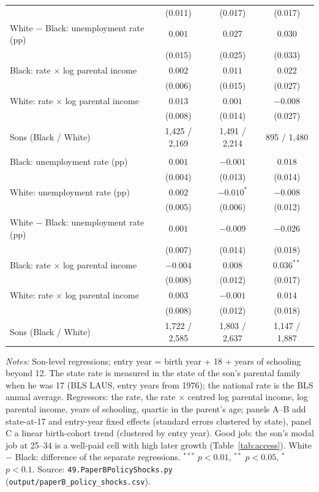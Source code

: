 \begin{table}[!htbp]
{{\begin{tabular}{lccc}
 & (0.011) & (0.017) & (0.017) \\
White $-$ Black: unemployment rate (pp) & $0.001$ & $0.027$ & $0.030$ \\
 & (0.015) & (0.025) & (0.033) \\
Black: rate $\times$ log parental income & $0.002$ & $0.011$ & $0.022$ \\
 & (0.006) & (0.015) & (0.027) \\
White: rate $\times$ log parental income & $0.013$ & $0.001$ & $-0.008$ \\
 & (0.008) & (0.014) & (0.027) \\
Sons (Black / White) & 1,425 / 2,169 & 1,491 / 2,214 & 895 / 1,480 \\
\addlinespace
\multicolumn{4}{l}{\textit{C. National unemployment rate at entry (linear cohort trend)}} \\
Black: unemployment rate (pp) & $0.001$ & $-0.001$ & $0.018$ \\
 & (0.004) & (0.013) & (0.014) \\
White: unemployment rate (pp) & $0.002$ & $-0.010^{*}$ & $-0.008$ \\
 & (0.005) & (0.006) & (0.012) \\
White $-$ Black: unemployment rate (pp) & $0.001$ & $-0.009$ & $-0.026$ \\
 & (0.007) & (0.014) & (0.018) \\
Black: rate $\times$ log parental income & $-0.004$ & $0.008$ & $0.036^{**}$ \\
 & (0.008) & (0.012) & (0.017) \\
White: rate $\times$ log parental income & $0.003$ & $-0.001$ & $0.014$ \\
 & (0.008) & (0.012) & (0.018) \\
Sons (Black / White) & 1,722 / 2,585 & 1,803 / 2,637 & 1,147 / 1,887 \\
\bottomrule
\end{tabular}}}
\par\smallskip
\begin{minipage}{\textwidth}\footnotesize \textit{Notes:} Son-level regressions; entry year = birth year + 18 + years of schooling beyond 12. The state rate is measured in the state of the son's parental family when he was 17 (BLS LAUS, entry years from 1976); the national rate is the BLS annual average. Regressors: the rate, the rate $\times$ centred log parental income, log parental income, years of schooling, quartic in the parent's age; panels A--B add state-at-17 and entry-year fixed effects (standard errors clustered by state), panel C a linear birth-cohort trend (clustered by entry year). Good job: the son's modal job at 25--34 is a well-paid cell with high later growth (Table~\ref{tab:access}). White $-$ Black: difference of the separate regressions. $^{***}$ $p<0.01$, $^{**}$ $p<0.05$, $^{*}$ $p<0.1$. Source: \texttt{49.PaperBPolicyShocks.py} (\texttt{output/paperB\_policy\_shocks.csv}).\end{minipage}
\end{table}

